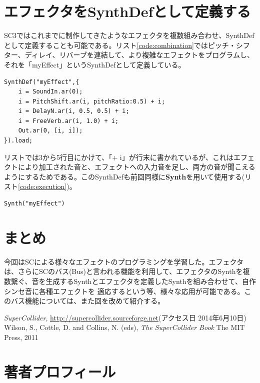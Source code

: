 \documentclass{jsarticle}
\begin{document}
\section{エフェクタをSynthDefとして定義する}
SC3ではこれまでに制作してきたようなエフェクタを複数組み合わせ、SynthDefとして定義することも可能である。リスト\ref{code:combination}ではピッチ・シフター、ディレイ、リバーブを連結して、より複雑なエフェクトをプログラムし、それを「myEffect」というSynthDefとして定義している。

\begin{lstlisting}[caption=エフェクトのSynthDef, label=code:combination]
SynthDef("myEffect",{
	i = SoundIn.ar(0);
	i = PitchShift.ar(i, pitchRatio:0.5) + i;
	i = DelayN.ar(i, 0.5, 0.5) + i;
	i = FreeVerb.ar(i, 1.0) + i;
	Out.ar(0, [i, i]);
}).load;
\end{lstlisting}

リストでは3から5行目にかけて、「+ i」が行末に書かれているが、これはエフェクトにより加工された音と、エフェクトへの入力音を足し、両方の音が聞こえるようにするためである。このSynthDefも前回同様に{\bf Synth}を用いて使用する(リスト\ref{code:execution})。

\begin{lstlisting}[caption=SynthDef "myEffect"の使用, label=code:execution]
Synth("myEffect")
\end{lstlisting}

\section{まとめ}
今回はSCによる様々なエフェクトのプログラミングを学習した。エフェクタは、さらにSCのバス(Bus)と言われる機能を利用して、エフェクタのSynthを複数繋ぐ、音を生成するSynthとエフェクタを定義したSynthを組み合わせて、自作シンセ音に各種エフェクトを
適応するという等、様々な応用が可能である。このバス機能については、また回を改めて紹介する。


\begin{thebibliography}{citations}
   {\it SuperCollider}, \url{http://supercollider.sourceforge.net}(アクセス日 2014年6月10日)
   Wilson, S., Cottle, D. and Collins, N. (eds), {\it The SuperCollider Book} The MIT Press, 2011

\end{thebibliography}

\section{著者プロフィール}
\end{document}
